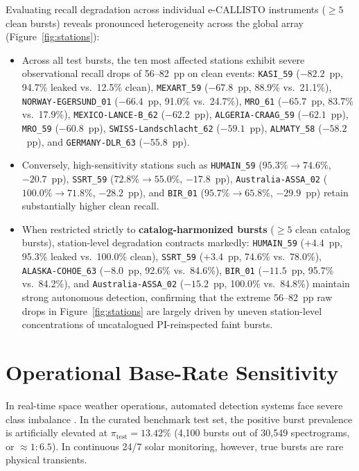 \documentclass[11pt,a4paper]{article}
\begin{document}
Evaluating recall degradation across individual e-CALLISTO instruments ($\ge 5$ clean bursts) reveals pronounced heterogeneity across the global array (Figure~\ref{fig:stations}):
\begin{itemize}
    \item Across all test bursts, the ten most affected stations exhibit severe observational recall drops of 56--82~pp on clean events: \texttt{KASI\_59} ($-82.2$~pp, 94.7\% leaked vs.\ 12.5\% clean), \texttt{MEXART\_59} ($-67.8$~pp, 88.9\% vs.\ 21.1\%), \texttt{NORWAY-EGERSUND\_01} ($-66.4$~pp, 91.0\% vs.\ 24.7\%), \texttt{MRO\_61} ($-65.7$~pp, 83.7\% vs.\ 17.9\%), \texttt{MEXICO-LANCE-B\_62} ($-62.2$~pp), \texttt{ALGERIA-CRAAG\_59} ($-62.1$~pp), \texttt{MRO\_59} ($-60.8$~pp), \texttt{SWISS-Landschlacht\_62} ($-59.1$~pp), \texttt{ALMATY\_58} ($-58.2$~pp), and \texttt{GERMANY-DLR\_63} ($-55.8$~pp).
    \item Conversely, high-sensitivity stations such as \texttt{HUMAIN\_59} ($95.3\% \to 74.6\%$, $-20.7$~pp), \texttt{SSRT\_59} ($72.8\% \to 55.0\%$, $-17.8$~pp), \texttt{Australia-ASSA\_02} ($100.0\% \to 71.8\%$, $-28.2$~pp), and \texttt{BIR\_01} ($95.7\% \to 65.8\%$, $-29.9$~pp) retain substantially higher clean recall.
    \item When restricted strictly to \textbf{catalog-harmonized bursts} ($\ge 5$ clean catalog bursts), station-level degradation contracts markedly: \texttt{HUMAIN\_59} ($+4.4$~pp, 95.3\% leaked vs.\ 100.0\% clean), \texttt{SSRT\_59} ($+3.4$~pp, 74.6\% vs.\ 78.0\%), \texttt{ALASKA-COHOE\_63} ($-8.0$~pp, 92.6\% vs.\ 84.6\%), \texttt{BIR\_01} ($-11.5$~pp, 95.7\% vs.\ 84.2\%), and \texttt{Australia-ASSA\_02} ($-15.2$~pp, 100.0\% vs.\ 84.8\%) maintain strong autonomous detection, confirming that the extreme 56--82~pp raw drops in Figure~\ref{fig:stations} are largely driven by uneven station-level concentrations of uncatalogued PI-reinspected faint bursts.
\end{itemize}

\section{Operational Base-Rate Sensitivity}

In real-time space weather operations, automated detection systems face severe class imbalance \cite{bloomfield2012toward, camporeale2019challenge}. In the curated benchmark test set, the positive burst prevalence is artificially elevated at $\pi_{\text{test}} = 13.42\%$ (4,100 bursts out of 30,549 spectrograms, or $\approx 1:6.5$). In continuous 24/7 solar monitoring, however, true bursts are rare physical transients.
\end{document}
